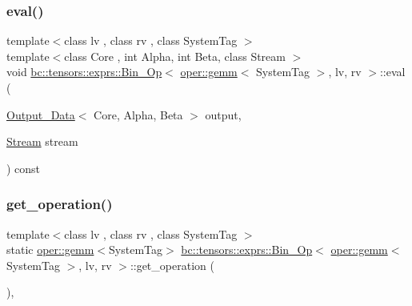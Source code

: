 \subsubsection{\texorpdfstring{eval()}{eval()}}
{\footnotesize\ttfamily template$<$class lv , class rv , class System\+Tag $>$ \\
template$<$class Core , int Alpha, int Beta, class Stream $>$ \\
void \hyperlink{structbc_1_1tensors_1_1exprs_1_1Bin__Op}{bc\+::tensors\+::exprs\+::\+Bin\+\_\+\+Op}$<$ \hyperlink{structbc_1_1oper_1_1gemm}{oper\+::gemm}$<$ System\+Tag $>$, lv, rv $>$\+::eval (\begin{DoxyParamCaption}\item[{\hyperlink{structbc_1_1tensors_1_1exprs_1_1Output__Data}{Output\+\_\+\+Data}$<$ Core, Alpha, Beta $>$}]{output,  }\item[{\hyperlink{classbc_1_1streams_1_1Stream}{Stream}}]{stream }\end{DoxyParamCaption}) const\hspace{0.3cm}{\ttfamily [inline]}}

\mbox{\label{structbc_1_1tensors_1_1exprs_1_1Bin__Op_3_01oper_1_1gemm_3_01SystemTag_01_4_00_01lv_00_01rv_01_4_a96432eb485b1d23f90638920f296ae1b}} 
\subsubsection{\texorpdfstring{get\+\_\+operation()}{get\_operation()}}
{\footnotesize\ttfamily template$<$class lv , class rv , class System\+Tag $>$ \\
static \hyperlink{structbc_1_1oper_1_1gemm}{oper\+::gemm}$<$System\+Tag$>$ \hyperlink{structbc_1_1tensors_1_1exprs_1_1Bin__Op}{bc\+::tensors\+::exprs\+::\+Bin\+\_\+\+Op}$<$ \hyperlink{structbc_1_1oper_1_1gemm}{oper\+::gemm}$<$ System\+Tag $>$, lv, rv $>$\+::get\+\_\+operation (\begin{DoxyParamCaption}{ }\end{DoxyParamCaption})\hspace{0.3cm}{\ttfamily [inline]}, {\ttfamily [static]}}

